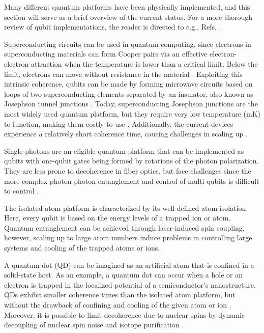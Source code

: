 
Many different quantum platforms have been physically implemented, and this section will serve as a brief overview of the current status. For a more thorough review of qubit implementations, the reader is directed to e.g., Refs. \cite{Ladd2010, Acin2018}.

Superconducting circuits can be used in quantum computing, since electrons in superconducting materials can form Cooper pairs via an effective electron-electron attraction when the temperature is lower than a critical limit. Below the limit, electrons can move without resistance in the material \cite{KristianFossheim2004}. Exploiting this intrinsic coherence, qubits can be made by forming microwave circuits based on loops of two superconducting elements separated by an insulator, also known as Josephson tunnel junctions \cite{Acin2018, Nakamura1999}. Today, superconducting Josephson junctions are the most widely used quantum platform, but they require very low temperature (mK) to function, making them costly to use \cite{Acin2018}. Additionally, the current devices experience a relatively short coherence time, causing challenges in scaling up \cite{Acin2018}.

Single photons are an eligible quantum platform that can be implemented as qubits with one-qubit gates being formed by rotations of the photon polarization. They are less prone to decoherence in fiber optics, but face challenges since the more complex photon-photon entanglement and control of multi-qubits is difficult to control \cite{Ladd2010}.


The isolated atom platform is characterized by its well-defined atom isolation. Here, every qubit is based on the energy levels of a trapped ion or atom. Quantum entanglement can be achieved through laser-induced spin coupling, however, scaling up to large atom numbers induce problems in controlling large systems and cooling of the trapped atoms or ions.

A quantum dot (QD) can be imagined as an artificial atom that is confined in a solid-state host. As an example, a quantum dot can occur when a hole or an electron is trapped in the localized potential of a semiconductor's nanostructure. QDs exhibit smaller coherence times than the isolated atom platform, but without the drawback of confining and cooling of the given atom or ion \cite{Acin2018}. Moreover, it is possible to limit decoherence due to nuclear spins by dynamic decoupling of nuclear spin noise and isotope purification \cite{Ladd2010}.

